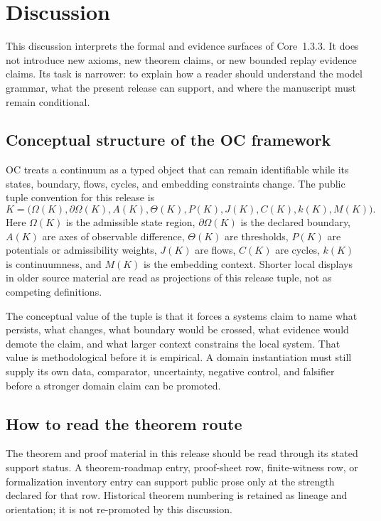 
\section{Discussion}
\label{sec:discussion}

This discussion interprets the formal and evidence surfaces of Core~1.3.3. It
does not introduce new axioms, new theorem claims, or new bounded replay evidence
claims. Its task is narrower: to explain how a reader should understand the
model grammar, what the present release can support, and where the manuscript
must remain conditional.

\subsection{Conceptual structure of the OC framework}

OC treats a continuum as a typed object that can remain identifiable while its
states, boundary, flows, cycles, and embedding constraints change. The public
tuple convention for this release is
\[
  K=\big(\Omega(K),\partial\Omega(K),A(K),\Theta(K),P(K),J(K),C(K),k(K),M(K)\big).
\]
Here \(\Omega(K)\) is the admissible state region, \(\partial\Omega(K)\) is the
declared boundary, \(A(K)\) are axes of observable difference, \(\Theta(K)\)
are thresholds, \(P(K)\) are potentials or admissibility weights, \(J(K)\) are
flows, \(C(K)\) are cycles, \(k(K)\) is continuumness, and \(M(K)\) is the
embedding context. Shorter local displays in older source material are read as
projections of this release tuple, not as competing definitions.

The conceptual value of the tuple is that it forces a systems claim to name
what persists, what changes, what boundary would be crossed, what evidence
would demote the claim, and what larger context constrains the local system.
That value is methodological before it is empirical. A domain instantiation
must still supply its own data, comparator, uncertainty, negative control, and
falsifier before a stronger domain claim can be promoted.

\subsection{How to read the theorem route}

The theorem and proof material in this release should be read through its stated
support status. A theorem-roadmap entry, proof-sheet row, finite-witness row, or
formalization inventory entry can support public prose only at the strength
declared for that row. Historical theorem numbering is retained as lineage and
orientation; it is not re-promoted by this discussion.


